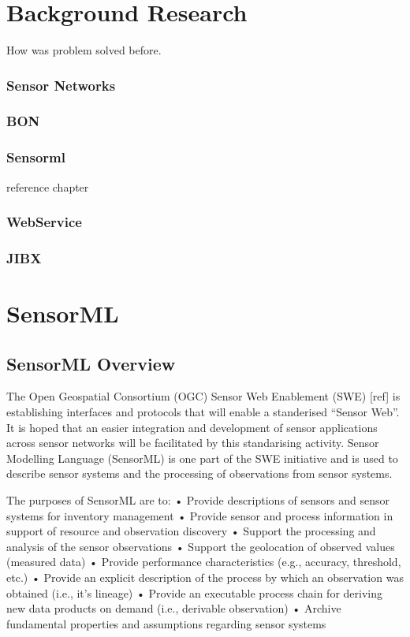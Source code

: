 \documentclass[]{final_report}
\begin{document}
\chapter{ Background Research}

How was problem solved before.

\subsection{Sensor Networks}
\subsection{BON}
\subsection{Sensorml}
reference chapter
\subsection{WebService}
\subsection{JIBX}

\chapter{SensorML}
\section{SensorML Overview}
The Open Geospatial Consortium (OGC) Sensor Web Enablement (SWE) [ref]  is establishing interfaces and protocols that will enable a standerised “Sensor Web”. It is hoped that an easier integration and development of sensor applications across sensor networks will be facilitated by this standarising activity. Sensor Modelling Language (SensorML) is one part of the SWE initiative and is used to describe sensor systems and the processing of observations from sensor systems.

The purposes of SensorML are to:
• Provide descriptions of sensors and sensor systems for inventory management
• Provide sensor and process information in support of resource and observation discovery
• Support the processing and analysis of the sensor observations
• Support the geolocation of observed values (measured data)
• Provide performance characteristics (e.g., accuracy, threshold, etc.)
• Provide an explicit description of the process by which an observation was obtained (i.e., it’s lineage)
• Provide an executable process chain for deriving new data products on demand (i.e., derivable observation)
• Archive fundamental properties and assumptions regarding sensor systems
\end{document}
